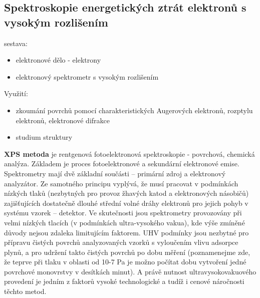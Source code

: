 \documentclass[../../main.tex]{subfiles}
\begin{document}
\subsection{Spektroskopie energetických ztrát elektronů s vysokým rozlišením}

sestava:
\begin{itemize}
	\item elektronové dělo - elektrony
	\item elektronový spektrometr s vysokým rozlišením
\end{itemize}
Využití:
\begin{itemize}
	\item zkoumání povrchů pomocí charakteristických Augerových elektronů, rozptylu elektronů, elektronové difrakce
	\item studium struktury
\end{itemize}

\textbf{XPS metoda} je rentgenová fotoelektronová spektroskopie - povrchová, chemická analýza. Základem je proces fotoelektronové a sekundární elektronové emise. Spektrometry mají dvě základní součásti – primární zdroj a elektronový analyzátor. Ze samotného principu vyplývá, že musí pracovat v podmínkách nízkých tlaků (nezbytných pro provoz žhavých katod a elektronových násobičů) zajišťujících dostatečně dlouhé střední volné dráhy elektronů pro jejich pohyb v systému vzorek – detektor. Ve skutečnosti jsou spektrometry provozovány při velmi nízkých tlacích (v podmínkách ultra-vysokého vakua), kde výše zmíněné důvody nejsou zdaleka limitujícím faktorem. UHV podmínky jsou nezbytné pro přípravu čistých povrchů analyzovaných vzorků s vyloučením vlivu adsorpce plynů, a pro udržení takto čistých povrchů po dobu měření (poznamenejme zde, že teprve při tlaku v oblasti od  10-7 Pa je možno počítat dobu vytvoření jedné povrchové monovrstvy v desítkách minut). A právě nutnost ultravysokovakuového provedení je jedním z faktorů vysoké technologické a tudíž i cenové náročnosti těchto metod. 
\end{document}
